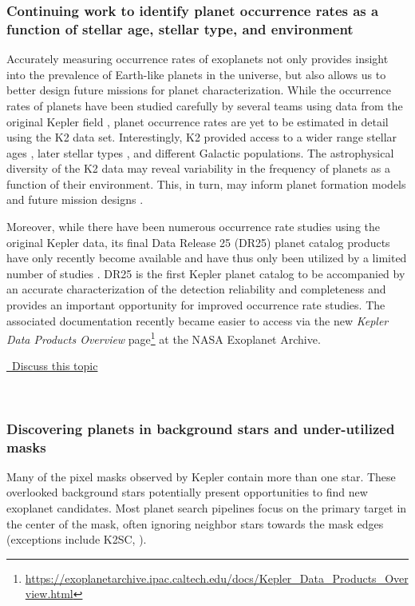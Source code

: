 \documentclass[modern]{aastex62}
\newcommand{\commentlink}[1]{\href{https://github.com/KeplerGO/ScientificOpportunities/issues/#1}{\sc \faExternalLink\ Discuss this topic}\,\,}
\begin{document}
\subsubsection{Continuing work to identify planet occurrence rates as a function of stellar age, stellar type, and environment} \label{sec:occRate}

Accurately measuring occurrence rates of exoplanets not only provides insight into the prevalence of Earth-like planets in the universe, but also allows us to better design future missions for planet characterization. While the occurrence rates of planets have been studied carefully by several teams using data from the original Kepler field \citep[e.g.][and references therein]{burke2015,mulders2018,garrett2018}, planet occurrence rates are yet to be estimated in detail using the K2 data set.  Interestingly, K2 provided access to a wider range stellar ages \citep[e.g.][]{mann2017}, later stellar types \citep[e.g.][]{dressing2017}, and different Galactic populations.  The astrophysical diversity of the K2 data may reveal variability in the frequency of planets as a function of their environment. This, in turn, may inform planet formation models and future mission designs \citep[see][]{kopparapu2018}.

Moreover, while there have been numerous occurrence rate studies using the original Kepler data, its final Data Release 25 (DR25) planet catalog products have only recently become available and have thus only been utilized by a limited number of studies \citep{mulders2018,narang2018,petigura2018-2}. DR25 is the first Kepler planet catalog to be accompanied by an accurate characterization of the detection reliability and completeness \citep{coughlin2017,thompson2018}
and provides an important opportunity for improved occurrence rate studies.
The associated documentation recently became easier to access via the new  {\em Kepler Data Products Overview} page\footnote{\url{https://exoplanetarchive.ipac.caltech.edu/docs/Kepler_Data_Products_Overview.html}} at the NASA Exoplanet Archive.
\\
\begin{center}
\commentlink{2}
\end{center}
\ \\

\subsubsection{Discovering planets in background stars and under-utilized masks}
Many of the pixel masks observed by Kepler contain more than one star. These overlooked background stars potentially present opportunities to find new exoplanet candidates.  Most planet search pipelines focus on the primary target in the center of the mask, often ignoring neighbor stars towards the mask edges (exceptions include K2SC, \citealt{aigrain2016}).
\end{document}
